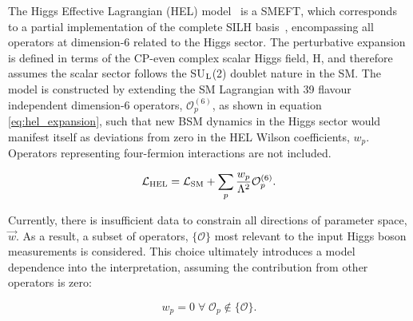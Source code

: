 The Higgs Effective Lagrangian (HEL) model~\cite{Alloul:2013naa} is a SMEFT, which corresponds to a partial implementation of the complete SILH basis~\cite{Giudice:2007fh,Contino:2013kra}, encompassing all operators at dimension-6 related to the Higgs sector. The perturbative expansion is defined in terms of the CP-even complex scalar Higgs field, H, and therefore assumes the scalar sector follows the SU$_{\rm{L}}$(2) doublet nature in the SM. The model is constructed by extending the SM Lagrangian with 39 flavour independent dimension-6 operators, $\mathcal{O}^{(6)}_p$, as shown in equation \ref{eq:hel_expansion}, such that new BSM dynamics in the Higgs sector would manifest itself as deviations from zero in the HEL Wilson coefficients, $w_p$. Operators representing four-fermion interactions are not included.



\begin{equation}\label{eq:hel_expansion}
    \mathcal{L}_{\rm{HEL}} = \mathcal{L}_{\rm{SM}} + \sum_p \frac{w_p}{\Lambda^2}\mathcal{O}^{(6)}_p .
\end{equation}

\noindent
Currently, there is insufficient data to constrain all directions of parameter space, $\vec{w}$. As a result, a subset of operators, $\{\mathcal{O}\}$  most relevant to the input Higgs boson measurements is considered. This choice ultimately introduces a model dependence into the interpretation, assuming the contribution from other operators is zero: 

\begin{equation}
  w_p=0 \; \forall \; \mathcal{O}_p \notin \{\mathcal{O}\}.   
\end{equation}

